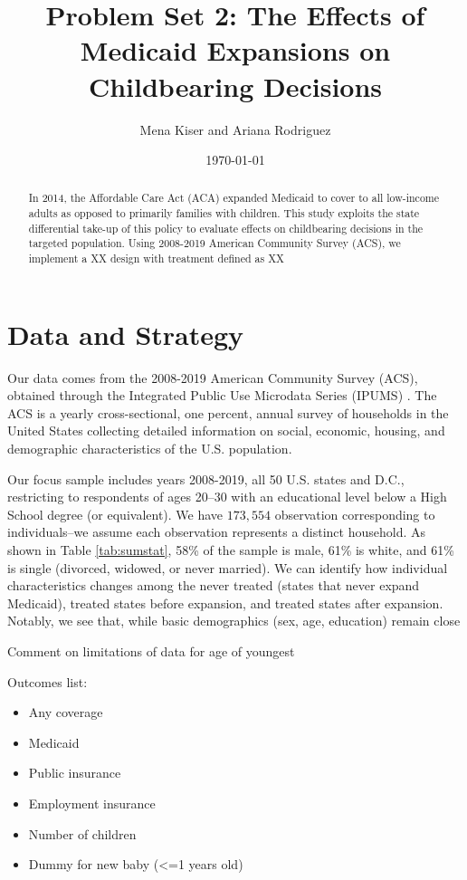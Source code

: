 \documentclass{article}
\title{Problem Set 2: The Effects of Medicaid Expansions on Childbearing Decisions}
\author{Mena Kiser and Ariana Rodriguez}
\date{\today}
\begin{document}
\maketitle

\begin{abstract}
    In 2014, the Affordable Care Act (ACA) expanded Medicaid to cover to all low-income adults as opposed to primarily families with children. This study exploits the state differential take-up of this policy to evaluate effects on childbearing decisions in the targeted population. Using 2008-2019 American Community Survey (ACS), we implement a XX design with treatment defined as XX
\end{abstract}

\section{Data and Strategy}
Our data comes from the 2008-2019 American Community Survey (ACS), obtained through the Integrated Public Use Microdata Series (IPUMS) \citep{data:acs}. The ACS is a yearly cross-sectional, one percent, annual survey of households in the United States collecting detailed information on social, economic, housing, and demographic characteristics of the U.S. population.

Our focus sample includes years 2008-2019, all 50 U.S. states and D.C., restricting to respondents of ages 20--30 with an educational level below a High School degree (or equivalent). We have $173,554$ observation corresponding to individuals--we assume each observation represents a distinct household. As shown in Table \ref{tab:sumstat}, 58\% of the sample is male, 61\% is white, and 61\% is single (divorced, widowed, or never married). We can identify how individual characteristics changes among the never treated (states that never expand Medicaid), treated states before expansion, and treated states after expansion. Notably, we see that, while basic demographics (sex, age, education) remain close

Comment on limitations of data for age of youngest 

Outcomes list:
\begin{itemize}
    \item Any coverage
    \item Medicaid
    \item Public insurance
    \item Employment insurance
    \item Number of children
    \item Dummy for new baby (<=1 years old)

\end{itemize}
\end{document}

